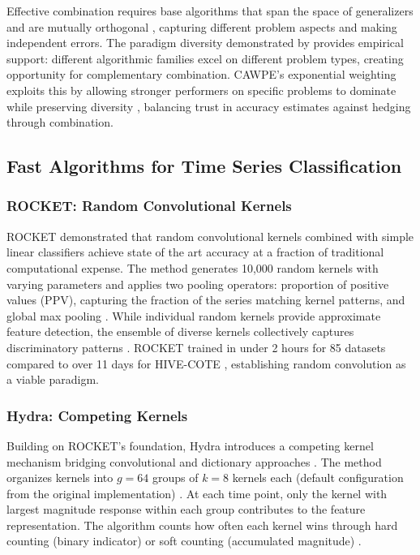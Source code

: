 \documentclass[pdflatex,sn-basic]{sn-jnl}           %
\theoremstyle{thmstyleone}%
\theoremstyle{thmstyletwo}%
\theoremstyle{thmstylethree}%
\begin{document}
Effective combination requires base algorithms that span the space of generalizers and are mutually orthogonal \citep[p.~256]{stacked-generalization}, capturing different problem aspects and making independent errors. The paradigm diversity demonstrated by \citet[Table~11, p.~648]{tsc-bakeoff} provides empirical support: different algorithmic families excel on different problem types, creating opportunity for complementary combination. CAWPE's exponential weighting exploits this by allowing stronger performers on specific problems to dominate while preserving diversity \citep[p.~1675]{cawpe}, balancing trust in accuracy estimates against hedging through combination.

\subsection{Fast Algorithms for Time Series Classification}

\subsubsection{ROCKET: Random Convolutional Kernels}

ROCKET \citep{rocket} demonstrated that random convolutional kernels combined with simple linear classifiers achieve state of the art accuracy at a fraction of traditional computational expense. The method generates 10,000 random kernels with varying parameters and applies two pooling operators: proportion of positive values (PPV), capturing the fraction of the series matching kernel patterns, and global max pooling \citep[Section~3, pp.~1462--1463]{rocket}. While individual random kernels provide approximate feature detection, the ensemble of diverse kernels collectively captures discriminatory patterns \citep[p.~1455]{rocket}. ROCKET trained in under 2 hours for 85 datasets compared to over 11 days for HIVE-COTE \citep[p.~1455]{rocket}, establishing random convolution as a viable paradigm.

\subsubsection{Hydra: Competing Kernels}

Building on ROCKET's foundation, Hydra introduces a competing kernel mechanism bridging convolutional and dictionary approaches \citep{hydra}. The method organizes kernels into $g=64$ groups of $k=8$ kernels each (default configuration from the original implementation) \citep[Section~3.2, p.~1788]{hydra}. At each time point, only the kernel with largest magnitude response within each group contributes to the feature representation. The algorithm counts how often each kernel wins through hard counting (binary indicator) or soft counting (accumulated magnitude) \citep[Section~3.2, pp.~1789--1790]{hydra}.
\end{document}
